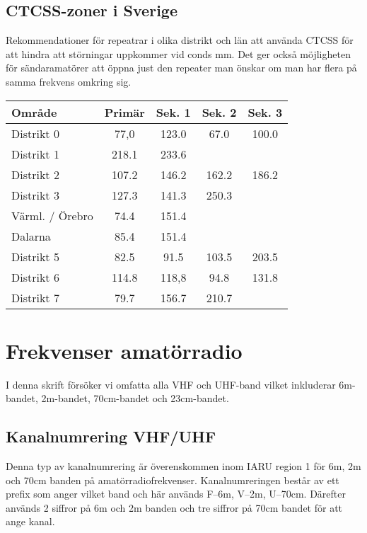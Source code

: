 \subsection{CTCSS-zoner i Sverige}

Rekommendationer för repeatrar i olika distrikt och län att använda CTCSS för att hindra att störningar uppkommer vid conds mm. Det ger också möjligheten för sändaramatörer att öppna just den repeater man önskar om man har flera på samma frekvens omkring sig.

\begin{tabular}{lcccc}
	\textbf{Område} & \textbf{Primär} & \textbf{Sek. 1} & \textbf{Sek. 2} & \textbf{Sek. 3} \\ \hline
	Distrikt 0      &      77,0       &      123.0      &      67.0       &      100.0      \\
	Distrikt 1      &      218.1      &      233.6      &                 &  \\
	Distrikt 2      &      107.2      &      146.2      &      162.2      &      186.2      \\
	Distrikt 3      &      127.3      &      141.3      &      250.3      &  \\
	Värml. / Örebro &      74.4       &      151.4      &                 &  \\
	Dalarna         &      85.4       &      151.4      &                 &  \\
	Distrikt 5      &      82.5       &      91.5       &      103.5      &      203.5      \\
	Distrikt 6      &      114.8      &      118,8      &      94.8       &      131.8      \\
	Distrikt 7      &      79.7       &      156.7      &      210.7      &
\end{tabular}

\section{Frekvenser amatörradio}

I denna skrift försöker vi omfatta alla VHF och UHF-band vilket inkluderar 6m-bandet, 2m-bandet, 70cm-bandet och 23cm-bandet.

\subsection{Kanalnumrering VHF/UHF}

Denna typ av kanalnumrering är överenskommen inom IARU region 1 för 6m, 2m och 70cm banden på amatörradiofrekvenser. Kanalnumreringen består av ett prefix som anger vilket band och här används F--6m, V--2m, U--70cm. Därefter används 2 siffror på 6m och 2m banden och tre siffror på 70cm bandet för att ange kanal. 

